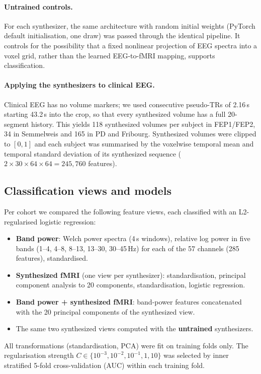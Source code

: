 \documentclass[11pt]{article}
\begin{document}
\paragraph{Untrained controls.}
For each synthesizer, the same architecture with random initial weights (PyTorch default initialisation, one draw) was passed through the identical pipeline.
It controls for the possibility that a fixed nonlinear projection of EEG spectra into a voxel grid, rather than the learned EEG-to-fMRI mapping, supports classification.

\paragraph{Applying the synthesizers to clinical EEG.}
Clinical EEG has no volume markers; we used consecutive pseudo-TRs of 2.16\,s starting 43.2\,s into the crop, so that every synthesized volume has a full 20-segment history.
This yields 118 synthesized volumes per subject in FEP1/FEP2, 34 in Semmelweis and 165 in PD and Fribourg.
Synthesized volumes were clipped to $[0,1]$ and each subject was summarised by the voxelwise temporal mean and temporal standard deviation of its synthesized sequence ($2\times30\times64\times64=245{,}760$ features).

\subsection{Classification views and models}\label{sec:clf}
Per cohort we compared the following feature views, each classified with an L2-regularised logistic regression:
\begin{itemize}
\item \textbf{Band power}: Welch power spectra (4\,s windows), relative log power in five bands (1--4, 4--8, 8--13, 13--30, 30--45\,Hz) for each of the 57 channels (285 features), standardised.
\item \textbf{Synthesized fMRI} (one view per synthesizer): standardisation, principal component analysis to 20 components, standardisation, logistic regression.
\item \textbf{Band power + synthesized fMRI}: band-power features concatenated with the 20 principal components of the synthesized view.
\item The same two synthesized views computed with the \textbf{untrained} synthesizers.
\end{itemize}
All transformations (standardisation, PCA) were fit on training folds only.
The regularisation strength $C\in\{10^{-3},10^{-2},10^{-1},1,10\}$ was selected by inner stratified 5-fold cross-validation (AUC) within each training fold.
\end{document}
